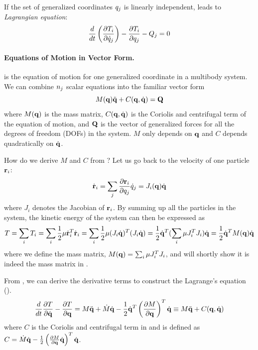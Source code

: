 If the set of generalized coordinates $q_j$ is linearly
independent,  leads to
\emph{Lagrangian equation}:
\begin{equation}\label{eq:lagrangian_dyn2}
    \frac{d}{dt} \left( \frac{\partial T_i}{\partial
    \dot{q}_j} \right) - \frac{\partial T_i}{\partial
    q_j} - Q_{j} = 0
\end{equation}

\paragraph{Equations of Motion in Vector Form.}  is the equation of motion for one generalized coordinate in a
multibody system. We can combine $n_j$  scalar equations into
the familiar vector form
\begin{equation}\label{eq:lagrangian_vector}
M(\mathbf{q}) \ddot{\mathbf{q}} + C(\mathbf{q}, \dot{\mathbf{q}}) = \mathbf{Q} 
\end{equation}
where $M(\mathbf{q})$ is the mass matrix, $C(\mathbf{q}, \dot{\mathbf{q}})$ is the
Coriolis and centrifugal term of the equation of motion, and $\mathbf{Q}$
is the vector of generalized forces for all the degrees of freedom
(DOFs) in the system. $M$ only depends on $\mathbf{q}$ and $C$ depends
quadratically on $\dot{\mathbf{q}}$.

How do we derive $M$ and $C$ from ?
Let us go back to the velocity of one particle $\mathbf{r}_i$:
\begin{equation}
\dot{\mathbf{r}}_i = \sum_j \frac{\partial
  \mathbf{r}_i}{\partial q_j} \dot{q}_j = J_i(\mathbf{q}) \dot{\mathbf{q}}
\end{equation}
where $J_i$ denotes the Jacobian of $\mathbf{r}_i$. By summing up
all the particles in the system, the kinetic
energy of the system can then be expressed as
\begin{equation}
\label{eq:kinetic_vector}
T = \sum_i T_i = \sum_i \frac{1}{2}  \mathbf{\mu} \dot{\mathbf{r}}_i^{T}
    \dot{\mathbf{r}}_i = \sum_i \frac{1}{2}  \mathbf{\mu} (J_i
    \dot{\mathbf{q}})^T(J_i \dot{\mathbf{q}}) = \frac{1}{2} \dot{\mathbf{q}}^T
    (\sum_i \mathbf{\mu} J_i^TJ_i) \dot{\mathbf{q}} = \frac{1}{2}
    \dot{\mathbf{q}}^T M(\mathbf{q}) \dot{\mathbf{q}}
\end{equation}
where we define the mass matrix, $M(\mathbf{q}) = \sum_i \mathbf{\mu}
J_i^TJ_i$, and will shortly show it is indeed the mass matrix in
.

From , we can derive the derivative
terms to construct the Lagrange's equation ().
\begin{equation}
\frac{d}{dt}\frac{\partial T}{\partial \dot{\mathbf{q}}} - \frac{\partial
  T}{\partial \mathbf{q}} = M\ddot{\mathbf{q}} + \dot{M} \dot{\mathbf{q}} - \frac{1}{2}\dot{\mathbf{q}}^T \left ( \frac{\partial M}{\partial \mathbf{q}} \right )^T \dot{\mathbf{q}} \equiv M
\ddot{\mathbf{q}} + C(\mathbf{q}, \dot{\mathbf{q}})
\end{equation}
where $C$ is the Coriolis and centrifugal term in  and is defined as $C = \dot{M}
\dot{\mathbf{q}} - \frac{1}{2}\left( \frac{\partial M}{\partial  \mathbf{q}} \dot{\mathbf{q}} \right)^T \dot{\mathbf{q}}$. 

